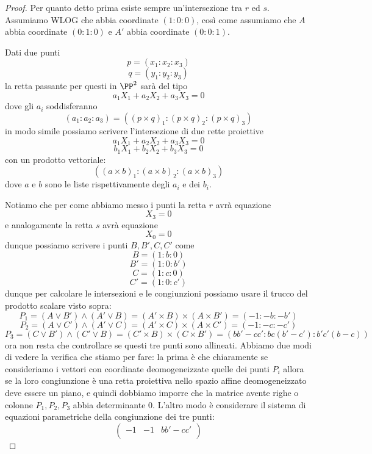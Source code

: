 \documentclass[11pt]{scrartcl}
\begin{document}
   	 \begin{proof}
   	 	Per quanto detto prima esiste sempre un'intersezione tra $r$ ed $s$. Assumiamo WLOG che abbia coordinate $(1:0:0)$, così come assumiamo che $A$ abbia coordinate $(0:1:0)$ e $A'$ abbia coordinate $(0:0:1)$. 
   	 	\begin{remark}
   	 		Dati due punti 
   	 		$$p=(x_1:x_2:x_3)$$
   	 		$$q=(y_1:y_2:y_3)$$
   	 		la retta passante per questi in $\PP^2$ sarà del tipo 
   	 		$$a_1X_1+a_2X_2+a_3X_3=0$$
   	 		dove gli $a_i$ soddisferanno
   	 		$$(a_1:a_2:a_3)=\left(\left(p\times q\right)_1:\left(p\times q\right)_2:\left(p\times q\right)_3\right)$$
   	 		in modo simile possiamo scrivere l'intersezione di due rette proiettive 
   	 		$$a_1X_1+a_2X_2+a_3X_3=0$$
   	 		$$b_1X_1+b_2X_2+b_3X_3=0$$
   	 		con un prodotto vettoriale:
   	 		$$\left(\left(a\times b\right)_1:\left(a\times b\right)_2:\left(a\times b\right)_3\right)$$
   	 		dove $a$ e $b$ sono le liste rispettivamente degli $a_i$ e dei $b_i$.
   	 	\end{remark}
   	 	Notiamo che per come abbiamo messo i punti la retta $r$ avrà equazione 
   	 	$$X_3=0$$
   	 	e analogamente la retta $s$ avrà equazione
   	 	$$X_0=0$$
   	 	dunque possiamo scrivere i punti $B,B',C,C'$ come
   	 	$$B=(1:b:0)$$
   	 	$$B'=(1:0:b')$$
   	 	$$C=(1:c:0)$$
   	 	$$C'=(1:0:c')$$
   	 	dunque per calcolare le intersezioni e le congiunzioni possiamo usare il trucco del prodotto scalare visto sopra:
   	 	$$P_1=\left(A\lor B'\right)\land \left(A'\lor B\right)=\left(A'\times B\right)\times \left(A\times B'\right)=(-1:-b:-b')$$
   	 	$$P_2=\left(A\lor C'\right)\land \left(A'\lor C\right)=\left(A'\times C\right)\times \left(A\times C'\right)=(-1:-c:-c')$$
   	 	$$P_3=\left(C\lor B'\right)\land \left(C'\lor B\right)=\left(C'\times B\right)\times \left(C\times B'\right)=(bb'-cc':bc(b'-c'):b'c'(b-c))$$
   	 	ora non resta che controllare se questi tre punti sono allineati. Abbiamo due modi di vedere la verifica che stiamo per fare: la prima è che chiaramente se consideriamo i vettori con coordinate deomogeneizzate quelle dei punti $P_i$ allora se la loro congiunzione è una retta proiettiva nello spazio affine deomogeneizzato deve essere un piano, e quindi dobbiamo imporre che la matrice avente righe o colonne $P_1, P_2,P_3 $ abbia determinante $0$. L'altro modo è considerare il sistema di equazioni parametriche della congiunzione dei tre punti:
   	 	$$\begin{pmatrix}
   	 		-1 & -1 & bb'-cc' \\

\end{pmatrix}$$
\end{proof}
\end{document}
